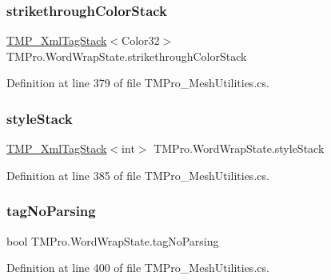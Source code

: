 \subsubsection{\texorpdfstring{strikethroughColorStack}{strikethroughColorStack}}
{\footnotesize\ttfamily \mbox{\hyperlink{struct_t_m_pro_1_1_t_m_p___xml_tag_stack}{T\+M\+P\+\_\+\+Xml\+Tag\+Stack}}$<$Color32$>$ T\+M\+Pro.\+Word\+Wrap\+State.\+strikethrough\+Color\+Stack}



Definition at line 379 of file T\+M\+Pro\+\_\+\+Mesh\+Utilities.\+cs.

\mbox{\label{struct_t_m_pro_1_1_word_wrap_state_aa333c2c26d8fb9e5107d82bb86b645d7}} 
\subsubsection{\texorpdfstring{styleStack}{styleStack}}
{\footnotesize\ttfamily \mbox{\hyperlink{struct_t_m_pro_1_1_t_m_p___xml_tag_stack}{T\+M\+P\+\_\+\+Xml\+Tag\+Stack}}$<$int$>$ T\+M\+Pro.\+Word\+Wrap\+State.\+style\+Stack}



Definition at line 385 of file T\+M\+Pro\+\_\+\+Mesh\+Utilities.\+cs.

\mbox{\label{struct_t_m_pro_1_1_word_wrap_state_a9b2f00c7a1fd24c21ec77d30382a3afc}} 
\subsubsection{\texorpdfstring{tagNoParsing}{tagNoParsing}}
{\footnotesize\ttfamily bool T\+M\+Pro.\+Word\+Wrap\+State.\+tag\+No\+Parsing}



Definition at line 400 of file T\+M\+Pro\+\_\+\+Mesh\+Utilities.\+cs.

\mbox{\label{struct_t_m_pro_1_1_word_wrap_state_a9aee5d1309f56ff5fc7f2b8515c97751}} 
